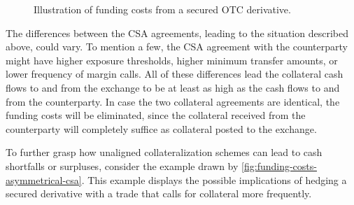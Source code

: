 \documentclass[main.tex]{subfiles}
\begin{document}
        \begin{figure}
            \centering
            \resizebox{\textwidth}{!}{%
            \begin{tikzpicture}
                
            \end{tikzpicture}        
            }   
            \caption{Illustration of funding costs from a secured OTC derivative.}
            \label{fig:funding-costs-secured-derivative}
        \end{figure}

        The differences between the CSA agreements, leading to the situation described above, could vary. 
        To mention a few, the CSA agreement with the counterparty might have higher exposure thresholds, 
        higher minimum transfer amounts, or lower frequency of margin calls.
        All of these differences lead the collateral cash flows to and from the exchange 
        to be at least as high as the cash flows to and from the counterparty. 
        In case the two collateral agreements are identical, the funding costs will be eliminated, 
        since the collateral received from the counterparty will completely suffice as collateral posted to the exchange.        

        To further grasp how unaligned collateralization schemes can lead to cash shortfalls or surpluses, 
        consider the example drawn by \cref{fig:funding-costs-asymmetrical-csa}.
        This example displays the possible implications of hedging a secured derivative
        with a trade that calls for collateral more frequently.
\end{document}

